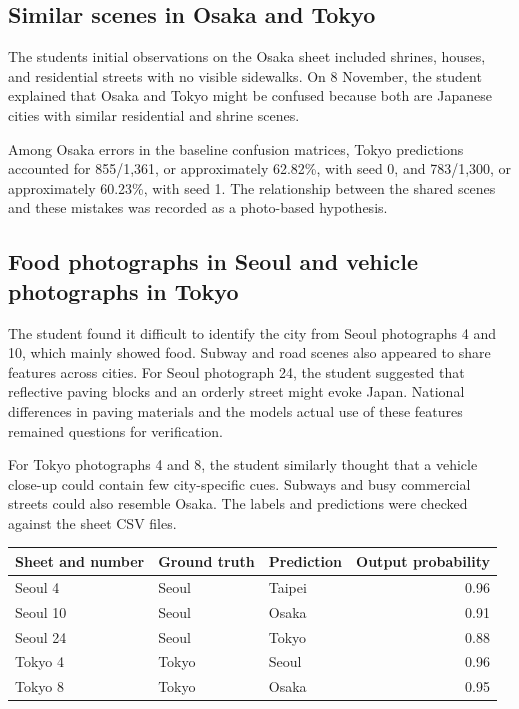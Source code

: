 \documentclass[11pt]{article}
\begin{document}
\subsection{Similar scenes in Osaka and Tokyo}

The student\textquotesingle{}s initial observations on the Osaka sheet included shrines,
houses, and residential streets with no visible sidewalks. On 8 November,
the student explained that Osaka and Tokyo might be confused because both
are Japanese cities with similar residential and shrine scenes.

Among Osaka errors in the baseline confusion matrices, Tokyo predictions
accounted for 855/1,361, or approximately 62.82\%, with seed 0, and 783/1,300,
or approximately 60.23\%, with seed 1. The relationship between the shared
scenes and these mistakes was recorded as a photo-based hypothesis.

\subsection{Food photographs in Seoul and vehicle photographs in Tokyo}

The student found it difficult to identify the city from Seoul photographs
4 and 10, which mainly showed food. Subway and road scenes also appeared to
share features across cities. For Seoul photograph 24, the student suggested
that reflective paving blocks and an orderly street might evoke Japan.
National differences in paving materials and the model\textquotesingle{}s actual use of these
features remained questions for verification.

For Tokyo photographs 4 and 8, the student similarly thought that a vehicle
close-up could contain few city-specific cues. Subways and busy commercial
streets could also resemble Osaka. The labels and predictions were checked
against the sheet CSV files.

\begin{center}\small
\begin{tabular}{lllr}
\toprule
Sheet and number & Ground truth & Prediction & Output probability \\
\midrule
Seoul 4 & Seoul & Taipei & 0.96 \\
Seoul 10 & Seoul & Osaka & 0.91 \\
Seoul 24 & Seoul & Tokyo & 0.88 \\
Tokyo 4 & Tokyo & Seoul & 0.96 \\
Tokyo 8 & Tokyo & Osaka & 0.95 \\
\bottomrule
\end{tabular}
\end{center}
\end{document}
